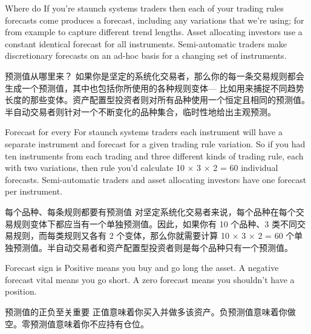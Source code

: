 
\begin{englishblock} Where do If you're staunch systems traders then each of your trading rules forecasts come produces a forecast, including any variations that we're using; for from example to capture different trend lengths. Asset allocating investors use a constant identical forecast for all instruments. Semi-automatic traders make discretionary forecasts on an ad-hoc basis for a changing set of instruments. \end{englishblock}

\begin{chineseblock}预测值从哪里来？ 如果你是坚定的系统化交易者，那么你的每一条交易规则都会生成一个预测值，其中也包括你所使用的各种规则变体--- 比如用来捕捉不同趋势长度的那些变体。资产配置型投资者则对所有品种使用一个恒定且相同的预测值。半自动交易者则针对一个不断变化的品种集合，临时性地给出主观预测。\end{chineseblock}

\bipairgap

\begin{englishblock} Forecast for every For staunch systems traders each instrument will have a separate instrument and forecast for a given trading rule variation. So if you had ten instruments from each trading and three different kinds of trading rule, each with two variations, then rule you'd calculate 10 × 3 × 2 = 60 individual forecasts. Semi-automatic traders and asset allocating investors have one forecast per instrument. \end{englishblock}

\begin{chineseblock}每个品种、每条规则都要有预测值 对坚定系统化交易者来说，每个品种在每个交易规则变体下都应当有一个单独预测值。因此，如果你有 10 个品种、3 类不同交易规则，而每类规则又各有 2 个变体，那么你就需要计算 10 × 3 × 2 = 60 个单独预测值。半自动交易者和资产配置型投资者则是每个品种只有一个预测值。\end{chineseblock}

\bipairgap

\begin{englishblock} Forecast sign is Positive means you buy and go long the asset. A negative forecast vital means you go short. A zero forecast means you shouldn't have a position. \end{englishblock}

\begin{chineseblock}预测值的正负至关重要 正值意味着你买入并做多该资产。负预测值意味着你做空。零预测值意味着你不应持有仓位。\end{chineseblock}

